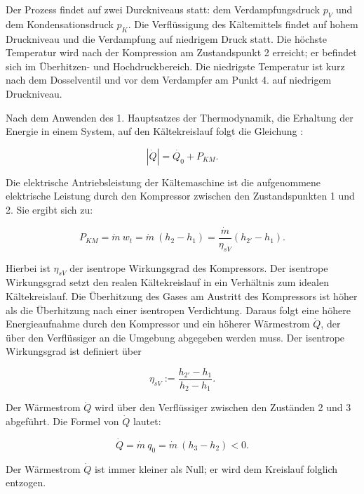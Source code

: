 Der Prozess findet auf zwei Durckniveaus statt: dem Verdampfungsdruck $p_V$ und dem Kondensationsdruck $p_K$. Die Verflüssigung des Kältemittels findet auf hohem Druckniveau und die Verdampfung auf niedrigem Druck statt. Die höchste Temperatur wird nach der Kompression am Zustandspunkt 2 erreicht; er befindet sich im Überhitzen- und Hochdruckbereich. Die niedrigste Temperatur ist kurz nach dem Dosselventil und vor dem Verdampfer am Punkt 4. auf niedrigem Druckniveau. 

Nach dem Anwenden des 1. Hauptsatzes der Thermodynamik, die Erhaltung der Energie in einem System, auf den Kältekreislauf folgt die Gleichung :

 \begin{equation}
 	|\dot{Q}|  = \dot{Q_0} +  P_{KM}.
 	\label{eq:Energiebilanz}
 \end{equation}
 
Die elektrische Antriebsleistung der Kältemaschine ist die aufgenommene elektrische Leistung durch den Kompressor zwischen den Zustandspunkten 1  und 2. Sie ergibt sich zu:

\begin{equation}
P_{KM} = \dot{m}~ w_t= \dot{m}~ (h_2 - h_1) = \frac{\dot{m} }{\eta_{sV}} (h_{2'}- h_1).
\label{eq:Antriebsleistung}
\end{equation}

Hierbei ist $\eta_{sV}$ der isentrope Wirkungsgrad des Kompressors. Der isentrope Wirkungsgrad setzt den realen Kältekreislauf in ein Verhältnis zum idealen Kältekreislauf. Die Überhitzung des Gases am Austritt des Kompressors ist höher als die Überhitzung nach einer isentropen Verdichtung. Daraus folgt eine höhere Energieaufnahme durch den Kompressor und ein höherer Wärmestrom $\dot{Q}$, der über den Verflüssiger an die Umgebung abgegeben werden muss. Der isentrope Wirkungsgrad ist definiert über 

\begin{equation}
\eta_{sV}:= \frac{h_{2'}- h_{1}}{h_2 - h_1}.
\label{eq:Antriebsleistung}
\end{equation}


Der Wärmestrom $\dot{Q}$ wird über den Verflüssiger zwischen den Zuständen 2 und 3 abgeführt. Die Formel von  $\dot{Q}$ lautet: 

\begin{equation}
	\dot{Q} = \dot{m}~q_0 = \dot{m}~ (h_3 - h_2)< 0.
	\label{eq:Wärmestrom}
\end{equation}

Der Wärmestrom $\dot{Q}$ ist immer kleiner als Null; er wird dem Kreislauf folglich entzogen.  
 
